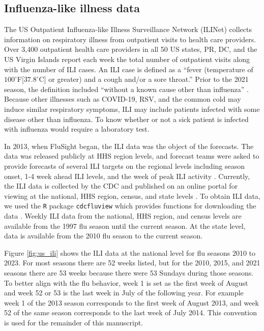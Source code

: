 \documentclass[ba]{imsart}
\theoremstyle{plain}
\theoremstyle{definition}
\theoremstyle{remark}
\begin{document}
\subsection{Influenza-like illness data}
The US Outpatient Influenza-like Illness Surveillance Network (ILINet) collects information on respiratory illness from outpatient visits to health care providers. Over 3,400 outpatient health care providers in all 50 US states, PR, DC, and the US Virgin Islands report each week the total number of outpatient visits along with the number of ILI cases. An ILI case is defined as a ``fever (temperature of $100^{\circ}$F[$37.8^{\circ}$C] or greater) and a cough and/or a sore throat.'' Prior to the 2021 season, the definition included ``without a known cause other than influenza'' \cite[]{cdcfluview2023}. Because other illnesses such as COVID-19, RSV, and the common cold may induce similar respiratory symptoms, ILI may include patients infected with some disease other than influenza. To know whether or not a sick patient is infected with influenza would require a laboratory test. 

In 2013, when FluSight began, the ILI data was the object of the forecasts. The data was released publicly at HHS region levels, and forecast teams were asked to provide forecasts of several ILI targets on the regional levels including season onset, 1-4 week ahead ILI levels, and the week of peak ILI activity \cite[]{biggerstaff2016results,mcgowan2019collaborative}. Currently, the ILI data is collected by the CDC and published on an online portal for viewing at the national, HHS region, census, and state levels \cite[]{cdc2024fluviewportal}. To obtain ILI data, we used the \texttt{R} package \texttt{cdcfluview} which provides functions for downloading the data \cite[]{rudis2021cdcfluview}. Weekly ILI data from the national, HHS region, and census levels are available from the 1997 flu season until the current season. At the state level, data is available from the 2010 flu season to the current season. 

Figure \ref{fig:us_ili} shows the ILI data at the national level for flu seasons 2010 to 2023. For most seasons there are 52 weeks listed, but for the 2010, 2015, and 2021 seasons there are 53 weeks because there were 53 Sundays during those seasons. 
To better align with the flu behavior, week 1 is set as the first week of August and week 52 or 53 is the last week in July of the following year. For example week 1 of the 2013 season corresponds to the first week of August 2013, and week 52 of the same season corresponds to the last week of July 2014. This convention is used for the remainder of this manuscript. 
\end{document}
